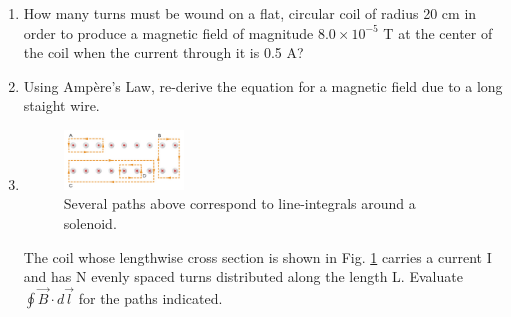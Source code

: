 \documentclass[10pt]{article}
\begin{document}
\begin{enumerate}
\begin{enumerate}
\item How many turns must be wound on a flat, circular coil of radius 20 cm in order to produce a magnetic field of magnitude $8.0 \times 10^{-5}$ T at the center of the coil when the current through it is 0.5 A? \\ \vspace{1.5cm}
\item Using Amp\`{e}re's Law, re-derive the equation for a magnetic field due to a long staight wire. \\ \vspace{4cm}
\item
\begin{figure}[hb]
\centering
\includegraphics[width=0.3\textwidth]{circuit2.png}
\caption{\label{fig:circuit2} Several paths above correspond to line-integrals around a solenoid.}
\end{figure}
The coil whose lengthwise cross section is shown in Fig. \ref{fig:circuit2} carries a current I and has N evenly spaced turns distributed along the length L. Evaluate $\oint \vec{B} \cdot d\vec{l}$ for the paths indicated.
\end{enumerate}
\end{enumerate}
\end{document}
